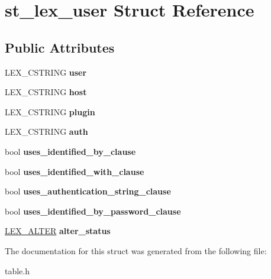 \hypertarget{structst__lex__user}{}\section{st\+\_\+lex\+\_\+user Struct Reference}
\label{structst__lex__user}
\subsection*{Public Attributes}
\begin{DoxyCompactItemize}
\item 
\mbox{\label{structst__lex__user_a9998b46baa23a5c1fce7dac05fc36a83}} 
L\+E\+X\+\_\+\+C\+S\+T\+R\+I\+NG {\bfseries user}
\item 
\mbox{\label{structst__lex__user_a5160c69893956f34837632c2d4318389}} 
L\+E\+X\+\_\+\+C\+S\+T\+R\+I\+NG {\bfseries host}
\item 
\mbox{\label{structst__lex__user_ad390d90441a3eb5e6fceaa27a2de412a}} 
L\+E\+X\+\_\+\+C\+S\+T\+R\+I\+NG {\bfseries plugin}
\item 
\mbox{\label{structst__lex__user_aedfdba1727e0c53b50bd39a703b17016}} 
L\+E\+X\+\_\+\+C\+S\+T\+R\+I\+NG {\bfseries auth}
\item 
\mbox{\label{structst__lex__user_a1a4b718bf6d97863a401d6546de0fa22}} 
bool {\bfseries uses\+\_\+identified\+\_\+by\+\_\+clause}
\item 
\mbox{\label{structst__lex__user_af6f0f1f01ed059c79df45302bd068b10}} 
bool {\bfseries uses\+\_\+identified\+\_\+with\+\_\+clause}
\item 
\mbox{\label{structst__lex__user_a913241c9576d3cba72d98b0a25ff6441}} 
bool {\bfseries uses\+\_\+authentication\+\_\+string\+\_\+clause}
\item 
\mbox{\label{structst__lex__user_afb38a26625ac25e42a9bcc38e89b6c4c}} 
bool {\bfseries uses\+\_\+identified\+\_\+by\+\_\+password\+\_\+clause}
\item 
\mbox{\label{structst__lex__user_a079f734004296693d965bac2a93ad94e}} 
\mbox{\hyperlink{structst__lex__alter}{L\+E\+X\+\_\+\+A\+L\+T\+ER}} {\bfseries alter\+\_\+status}
\end{DoxyCompactItemize}


The documentation for this struct was generated from the following file\+:\begin{DoxyCompactItemize}
\item 
table.\+h\end{DoxyCompactItemize}
